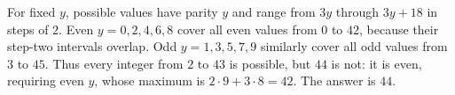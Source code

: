 For fixed $y$, possible values have parity $y$ and range from $3y$ through $3y+18$ in steps of $2$. Even $y=0,2,4,6,8$ cover all even values from $0$ to $42$, because their step-two intervals overlap. Odd $y=1,3,5,7,9$ similarly cover all odd values from $3$ to $45$. Thus every integer from $2$ to $43$ is possible, but $44$ is not: it is even, requiring even $y$, whose maximum is $2\cdot9+3\cdot8=42$. The answer is $\boxed{44}$.
